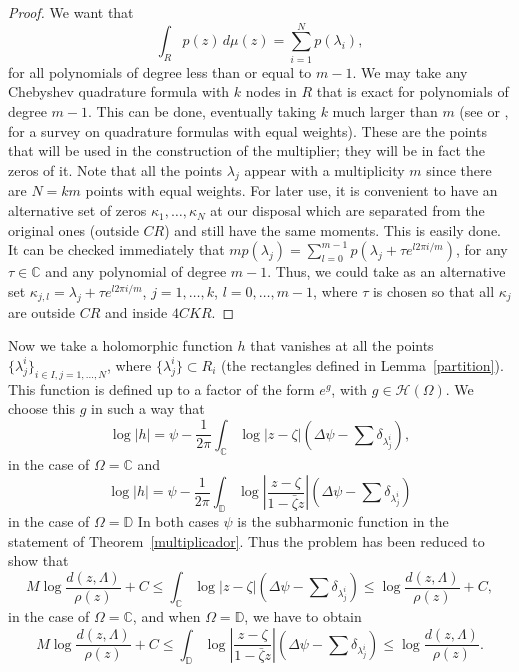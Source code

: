 \documentclass[12pt,twoside,final,psamsfonts]{amsart}
\theoremstyle{plain}
\theoremstyle{remark}
\theoremstyle{definition}
\newcommand{\C}{{\mathbb C}}
\newcommand{\D}{{\mathbb D}}
\renewcommand{\H}{{\mathcal H}}
\begin{document}
\begin{proof}
We want that
\[
\int_R p(z)\, d\mu(z)=\sum_{i=1}^N p(\lambda_i),
\]
for all polynomials of degree less than or equal to $m-1$. We may take any
Chebyshev quadrature formula with $k$ nodes in $R$ that is exact for
polynomials of degree $m-1$. This can be done, eventually taking $k$ much
larger than $m$ (see \cite{Gautschi76} or 
\cite{Korevaar94}, for a survey on quadrature formulas
with equal weights). These are the points that will be used in the construction
of the multiplier; they will be in fact the zeros of it. Note that all the
points  $\lambda_j$ appear with a multiplicity $m$ since there are $N=km$ points with
equal weights. For later use, it is convenient to have an alternative set of
zeros $\kappa_1,\ldots,\kappa_N$  at our disposal which are separated from the original
ones (outside $CR$) and still have the same moments. 
This is easily done. It can be checked immediately that
$mp(\lambda_j)=\sum_{l=0}^{m-1}p(\lambda_j+ \tau e^{l2\pi i/m})$, for any 
$\tau\in
\C$ and any polynomial of degree $m-1$. Thus, we could take as an alternative
set  $\kappa_{j,l}=\lambda_j+\tau e^{l2\pi i/m}$, $j=1,\ldots,k$, $l=0,\ldots,m-1$,
where $\tau$ is chosen 
so that all $\kappa_j$ are outside $CR$ and inside $4CKR$.
\end{proof}

Now we take a holomorphic function $h$ that vanishes at all the points 
$\{\lambda_j^i\}_{i\in I,j=1,\ldots,N}$, where 
$\{\lambda_j^i\}\subset R_i$ (the rectangles defined in Lemma~\ref{partition}). 
This function is defined up to a 
factor of
the form $e^g$, with $g\in \H(\Omega)$. We choose this $g$ in such a way that 
\[
\log|h|= \psi - \frac 1{2\pi} \int_{\C} 
\log|z-\zeta| (\Delta\psi-\sum \delta_{\lambda_j^i}),
\]
in the case of $\Omega=\C$ and
\[
\log|h|=\psi -\frac 1{2\pi}
\int_{\D} \log\left|\frac{z-\zeta}{1-\bar\zeta z}\right|
(\Delta\psi-\sum \delta_{\lambda_j^i})
\]
in the case of $\Omega=\D$ In both cases $\psi$ is the subharmonic function in
the statement of Theorem~\ref{multiplicador}.
Thus the problem has been reduced to show that
\begin{equation}\label{diferenciaC}
M\log{\frac{d(z,\Lambda)}{\rho(z)}}+C\le 
\int_{\C} \log|z-\zeta| (\Delta\psi-\sum \delta_{\lambda_j^i})\le
\log{\frac{d(z,\Lambda)}{\rho(z)}}+C,
\end{equation}
in the case of $\Omega=\C$, and  when $\Omega=\D$, we have to obtain
\begin{equation}\label{diferenciaD}
M\log{\frac{d(z,\Lambda)}{\rho(z)}}+C\le
\int_{\D} \log\left|\frac{z-\zeta}{1-\bar\zeta z}\right|
(\Delta\psi-\sum \delta_{\lambda_j^i})\le
\log{\frac{d(z,\Lambda)}{\rho(z)}}.
\end{equation}
\end{document}
